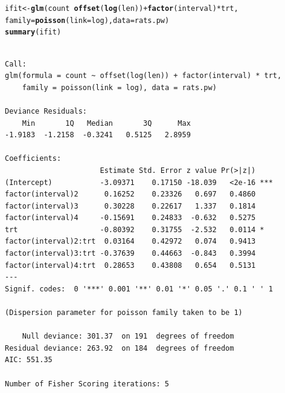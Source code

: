 \documentclass[oneside]{book}\usepackage[]{graphicx}\usepackage[svgnames]{xcolor}
\makeatletter
\newcommand{\hlopt}[1]{\textcolor[rgb]{0,0,0}{#1}}%
\newcommand{\hlstd}[1]{\textcolor[rgb]{0.345,0.345,0.345}{#1}}%
\newcommand{\hlkwb}[1]{\textcolor[rgb]{0.69,0.353,0.396}{#1}}%
\newcommand{\hlkwc}[1]{\textcolor[rgb]{0.333,0.667,0.333}{#1}}%
\newcommand{\hlkwd}[1]{\textcolor[rgb]{0.737,0.353,0.396}{\textbf{#1}}}%
\newenvironment{kframe}{%
 \def\at@end@of@kframe{}%
 \ifinner\ifhmode%
  \def\at@end@of@kframe{\end{minipage}}%
  \begin{minipage}{\columnwidth}%
 \fi\fi%
 \def\FrameCommand##1{\hskip\@totalleftmargin \hskip-\fboxsep
 \colorbox{shadecolor}{##1}\hskip-\fboxsep
     \hskip-\linewidth \hskip-\@totalleftmargin \hskip\columnwidth}%
 \MakeFramed {\advance\hsize-\width
   \@totalleftmargin\z@ \linewidth\hsize
   \@setminipage}}%
 {\par\unskip\endMakeFramed%
 \at@end@of@kframe}
\newenvironment{knitrout}{}{} %
\makeatother
\begin{document}
\begin{knitrout}
\color{fgcolor}\begin{kframe}
\begin{alltt}
\hlstd{ifit} \hlkwb{<-} \hlkwd{glm}\hlstd{(count} \hlopt{~} \hlkwd{offset}\hlstd{(}\hlkwd{log}\hlstd{(len))} \hlopt{+} \hlkwd{factor}\hlstd{(interval)} \hlopt{*} \hlstd{trt,}
  \hlkwc{family} \hlstd{=} \hlkwd{poisson}\hlstd{(}\hlkwc{link} \hlstd{= log),} \hlkwc{data} \hlstd{= rats.pw)}
\hlkwd{summary}\hlstd{(ifit)}
\end{alltt}
\begin{verbatim}

Call:
glm(formula = count ~ offset(log(len)) + factor(interval) * trt, 
    family = poisson(link = log), data = rats.pw)

Deviance Residuals: 
    Min       1Q   Median       3Q      Max  
-1.9183  -1.2158  -0.3241   0.5125   2.8959  

Coefficients:
                      Estimate Std. Error z value Pr(>|z|)    
(Intercept)           -3.09371    0.17150 -18.039   <2e-16 ***
factor(interval)2      0.16252    0.23326   0.697   0.4860    
factor(interval)3      0.30228    0.22617   1.337   0.1814    
factor(interval)4     -0.15691    0.24833  -0.632   0.5275    
trt                   -0.80392    0.31755  -2.532   0.0114 *  
factor(interval)2:trt  0.03164    0.42972   0.074   0.9413    
factor(interval)3:trt -0.37639    0.44663  -0.843   0.3994    
factor(interval)4:trt  0.28653    0.43808   0.654   0.5131    
---
Signif. codes:  0 '***' 0.001 '**' 0.01 '*' 0.05 '.' 0.1 ' ' 1

(Dispersion parameter for poisson family taken to be 1)

    Null deviance: 301.37  on 191  degrees of freedom
Residual deviance: 263.92  on 184  degrees of freedom
AIC: 551.35

Number of Fisher Scoring iterations: 5
\end{verbatim}
\end{kframe}
\end{knitrout}
\end{document}
